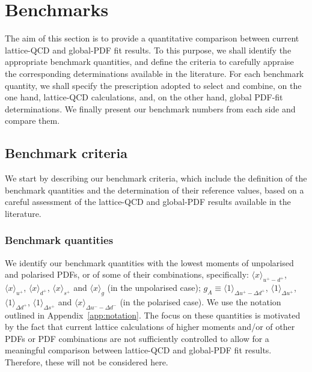\section{Benchmarks}
\label{sec:benchmarking}

The aim of this section is to provide a quantitative comparison between 
current lattice-QCD and global-PDF fit results.
%
To this purpose, we shall identify the appropriate benchmark quantities, 
and define the criteria to carefully appraise the corresponding determinations
available in the literature.
%
For each benchmark quantity, we shall specify the prescription adopted to 
select and combine, on the one hand, lattice-QCD calculations, and, on the 
other hand, global PDF-fit determinations.
%
We finally present our benchmark numbers from each side and compare them.

\subsection{Benchmark criteria}
\label{subsec:BC}

We start by describing our benchmark criteria, which include the definition
of the benchmark quantities and the determination of their reference values,
based on a careful assessment of the lattice-QCD and global-PDF results 
available in the literature.

\subsubsection{Benchmark quantities}
\label{subsubsec:BQ}

We identify our benchmark quantities with the lowest moments of unpolarised 
and polarised PDFs, or of some of their combinations, specifically: 
$\langle x\rangle_{u^+-d^+}$, $\langle x \rangle_{u^+}$, $\langle x \rangle_{d^+}$, 
$\langle x \rangle_{s^+}$ and $\langle x \rangle_{g}$ (in the unpolarised case); 
$g_A\equiv\langle 1 \rangle_{\Delta u^+ - \Delta d ^+}$, 
$\langle 1 \rangle_{\Delta u^+}$, $\langle 1 \rangle_{\Delta d^+}$,  
$\langle 1 \rangle_{\Delta s^+}$ and $\langle x \rangle_{\Delta u^- - \Delta d^-}$ 
(in the polarised case).
%
We use the notation outlined in Appendix~\ref{app:notation}.
%
The focus on these quantities is motivated by the fact that
current lattice calculations of higher moments and/or of other PDFs or PDF 
combinations are not sufficiently controlled to allow for a meaningful 
comparison between lattice-QCD and global-PDF fit results.
%
Therefore, these will not be considered here. 

